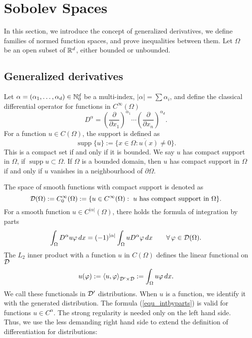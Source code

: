 \chapter{Sobolev Spaces}
\label{sec_sobolev}
%
In this section, we introduce the concept of generalized derivatives, we
define families of normed function spaces, and prove inequalities between
them.
Let $\Omega$ be an open subset of ${\mathbb R}^d$, either bounded or unbounded.

\section{Generalized derivatives}

Let $\alpha = (\alpha_1, \ldots , \alpha_d) \in {\mathbb N}_0^d$ be a multi-index,
$| \alpha | = \sum \alpha_i$, 
and define the classical differential operator for functions in $C^\infty (\Omega)$
$$
D^\alpha = 
        \left( \frac{\partial}{\partial x_1} \right)^{\alpha_1} \cdots
        \left( \frac{\partial}{\partial x_n} \right)^{\alpha_d}.
$$
%
For a function $u \in C(\Omega)$, the support is defined as 
$$
\operatorname{supp} \{ u \} := \overline{ \{ x \in \Omega : u(x) \neq 0 \} }.
$$
This is a compact set if and only if it is bounded. We say $u$ has
compact support in $\Omega$, if $\operatorname{supp} u \subset \Omega$.
If $\Omega$ is a bounded domain, then $u$ has compact support in $\Omega$
if and only if $u$ vanishes in a neighbourhood of $\partial \Omega$.

\medskip
\noindent
The space of smooth functions with compact support is denoted as
\begin{equation}
{\cal D} (\Omega) := C_0^\infty (\Omega) := 
\{ u \in C^\infty(\Omega) : \mbox{ $u$ has compact support in $\Omega$} \}.
\end{equation}
%
For a smooth function $u \in C^{|\alpha|}(\Omega)$, there holds the
formula of integration by parts
\begin{equation} \label{equ_intbyparts}
\int_\Omega D^\alpha u \varphi \, dx = (-1)^{|\alpha|} \int_\Omega u D^\alpha \varphi \, dx 
\qquad \forall \, \varphi \in {\cal D}(\Omega).
\end{equation}
The $L_2$ inner product with a function $u$ in $C(\Omega)$ defines the linear
functional on ${\cal D}$
$$
u(\varphi) := \left< u, \varphi \right>_{{\cal D}^\prime \times {\cal D}} := \int_\Omega u \varphi \, dx.
$$
We call these functionals in ${\cal D}^\prime$ distributions.
When $u$ is a function, we identify it with the generated distribution.
The formula (\ref{equ_intbyparts}) is valid for functions $u \in C^\alpha$.
The strong regularity is needed only on the left hand side. Thus, we use
the less demanding right hand side to extend the definition of differentiation
for distributions:


